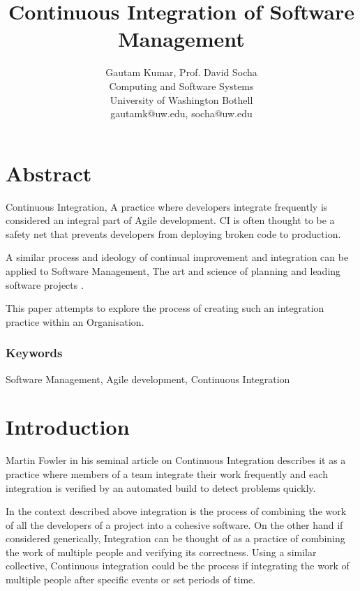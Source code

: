 \documentclass[10pt,conference]{IEEEtran}
\begin{document}
\title{Continuous Integration of Software Management}


\author{
{\rm Gautam Kumar, Prof. David Socha}\\
Computing and Software Systems\\
University of Washington Bothell\\
gautamk@uw.edu, socha@uw.edu
} %

\maketitle
\thispagestyle{empty}


\section*{Abstract}
Continuous Integration, A practice where developers integrate 
frequently\cite{stahl_modeling_2014} is considered an integral part of Agile 
development. CI is often thought to be a safety net that prevents developers from deploying broken code to production. 

A similar process and ideology of continual improvement and integration can be applied to Software Management, The art and science of planning and leading software projects \cite{stellman_applied_2005}.

This paper attempts to explore the process of creating such an integration practice within an Organisation.

\subsubsection*{Keywords}

Software Management, Agile development, Continuous Integration

\section*{Introduction}

Martin Fowler in his seminal article\cite{fowler_continuous_2006} on Continuous Integration describes it as a practice where members of a team integrate their work frequently and each integration is verified by an automated build to detect problems quickly.

In the context described above integration is the process of combining the work of all the developers of a project into a cohesive software. On the other hand if considered generically, Integration can be thought of as a practice of combining the work of multiple people and verifying its correctness. Using a similar collective, Continuous integration could be the process if integrating the work of multiple people after specific events or set periods of time. 
\end{document}
